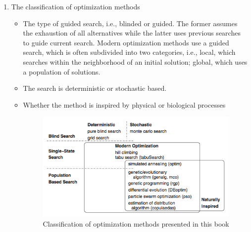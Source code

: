 \documentclass[12pt, a4paper]{article}
\begin{document}
\begin{enumerate}
\item The classification of optimization methods
 \begin{itemize}
 \item The type of guided search, i.e., blinded or guided. The former assumes the exhaustion of all alternatives while the latter uses previous searches to guide current search. Modern optimization methods use a guided search, which is often subdivided into two categories, i.e., local, which searches within the neighborhood of an initial solution; global, which uses a population of solutions.
 \item The search is deterministic or stochastic based. 
 \item Whether the method is inspired by physical or biological processes
 
 \begin{figure}
 \caption{Classification of optimization methods presented in this book}
 \centering
 \includegraphics{b.png}
 \end{figure} 
 \end{itemize}

\end{enumerate}
\end{document}
